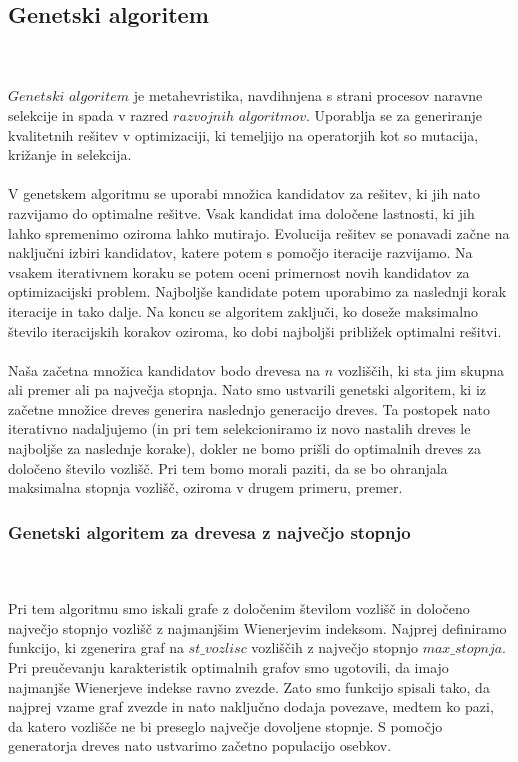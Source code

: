 \documentclass[12pt,a4paper]{amsart}
\theoremstyle{definition} %
\theoremstyle{plain} %
\begin{document}
\subsection{Genetski algoritem}
\
\\
\\
$Genetski$ $algoritem$ je metahevristika, navdihnjena s strani procesov naravne selekcije in spada v razred $razvojnih$
$algoritmov$. Uporablja se za generiranje kvalitetnih rešitev v optimizaciji, ki temeljijo na operatorjih kot so mutacija, križanje
in selekcija.  
\\
\\
V genetskem algoritmu se uporabi množica kandidatov za rešitev, ki jih nato razvijamo do optimalne rešitve. Vsak kandidat
ima določene lastnosti, ki jih lahko spremenimo oziroma lahko mutirajo. Evolucija rešitev se ponavadi začne na naključni izbiri kandidatov,
katere potem s pomočjo iteracije razvijamo. Na vsakem iterativnem koraku se potem oceni primernost novih kandidatov za optimizacijski
problem. Najboljše kandidate potem uporabimo za naslednji korak iteracije in tako dalje. Na koncu se algoritem zaključi,
ko doseže maksimalno število iteracijskih korakov oziroma, ko dobi najboljši približek optimalni rešitvi.
\\
\\
Naša začetna množica kandidatov bodo drevesa na $n$ vozliščih, ki sta jim skupna ali premer ali pa največja stopnja. 
Nato smo ustvarili genetski algoritem, ki iz začetne množice dreves generira naslednjo generacijo dreves. Ta postopek nato iterativno
nadaljujemo (in pri tem selekcioniramo iz novo nastalih dreves le najboljše za naslednje korake), dokler ne bomo prišli do optimalnih 
dreves za določeno število vozlišč. Pri tem bomo morali paziti, da se bo ohranjala maksimalna stopnja vozlišč, 
oziroma v drugem primeru, premer.
\subsubsection{Genetski algoritem za drevesa z največjo stopnjo}
\
\\
\\
Pri tem algoritmu smo iskali grafe z določenim številom vozlišč in določeno največjo stopnjo vozlišč z najmanjšim Wienerjevim indeksom. Najprej definiramo funkcijo, ki zgenerira graf na $st\_vozlisc$ vozliščih z največjo stopnjo $max\_stopnja$.
Pri preučevanju karakteristik optimalnih grafov smo ugotovili, da imajo najmanjše Wienerjeve indekse ravno zvezde. Zato 
smo funkcijo spisali tako, da najprej vzame graf zvezde in nato naključno dodaja povezave, medtem ko pazi, da katero vozlišče
ne bi preseglo največje dovoljene stopnje.
S pomočjo generatorja dreves nato ustvarimo začetno populacijo osebkov.
\end{document}
